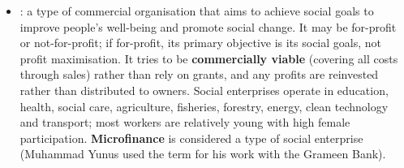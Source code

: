 \begin{itemize}
\begin{itemize}
    \item \textbf{Reduced vulnerability} to fluctuating export prices.
    \item \textbf{Use of domestic raw materials} as the base for manufacturing (successful examples: Malaysia, Thailand, Indonesia, China, Chile, Mauritius).
  \end{itemize}
  \item {}: a type of commercial organisation that aims to achieve social goals to improve people's well-being and promote social change. It may be for-profit or not-for-profit; if for-profit, its primary objective is its social goals, not profit maximisation. It tries to be \textbf{commercially viable} (covering all costs through sales) rather than rely on grants, and any profits are reinvested rather than distributed to owners. Social enterprises operate in education, health, social care, agriculture, fisheries, forestry, energy, clean technology and transport; most workers are relatively young with high female participation. \textbf{Microfinance} is considered a type of social enterprise (Muhammad Yunus used the term for his work with the Grameen Bank).
\end{itemize}

